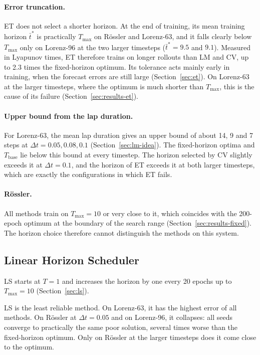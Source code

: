 \documentclass{article}
\begin{document}
\paragraph{Error truncation.}
ET does not select a shorter horizon. At the end of training, its mean training horizon $\bar t^*$ is practically $T_{\max}$ on Rössler and Lorenz-63, and it falls clearly below $T_{\max}$ only on Lorenz-96 at the two larger timesteps ($\bar t^* = 9.5$ and $9.1$). Measured in Lyapunov times, ET therefore trains on longer rollouts than LM and CV, up to 2.3 times the fixed-horizon optimum. Its tolerance acts mainly early in training, when the forecast errors are still large (Section~\ref{sec:et}). On Lorenz-63 at the larger timesteps, where the optimum is much shorter than $T_{\max}$, this is the cause of its failure (Section~\ref{sec:results-et}).

\paragraph{Upper bound from the lap duration.}
For Lorenz-63, the mean lap duration gives an upper bound of about 14, 9 and 7 steps at $\Delta t = 0.05, 0.08, 0.1$ (Section~\ref{sec:lm-idea}). The fixed-horizon optima and $T_{\mathrm{base}}$ lie below this bound at every timestep. The horizon selected by CV slightly exceeds it at $\Delta t = 0.1$, and the horizon of ET exceeds it at both larger timesteps, which are exactly the configurations in which ET fails.

\paragraph{Rössler.}
All methods train on $T_{\max} = 10$ or very close to it, which coincides with the 200-epoch optimum at the boundary of the search range (Section~\ref{sec:results-fixed}). The horizon choice therefore cannot distinguish the methods on this system.

\subsection{Linear Horizon Scheduler}
\label{sec:results-ls}

LS starts at $T = 1$ and increases the horizon by one every 20 epochs up to $T_{\max} = 10$ (Section~\ref{sec:ls}).

LS is the least reliable method. On Lorenz-63, it has the highest error of all methods. On Rössler at $\Delta t = 0.05$ and on Lorenz-96, it collapses: all seeds converge to practically the same poor solution, several times worse than the fixed-horizon optimum. Only on Rössler at the larger timesteps does it come close to the optimum.
\end{document}
